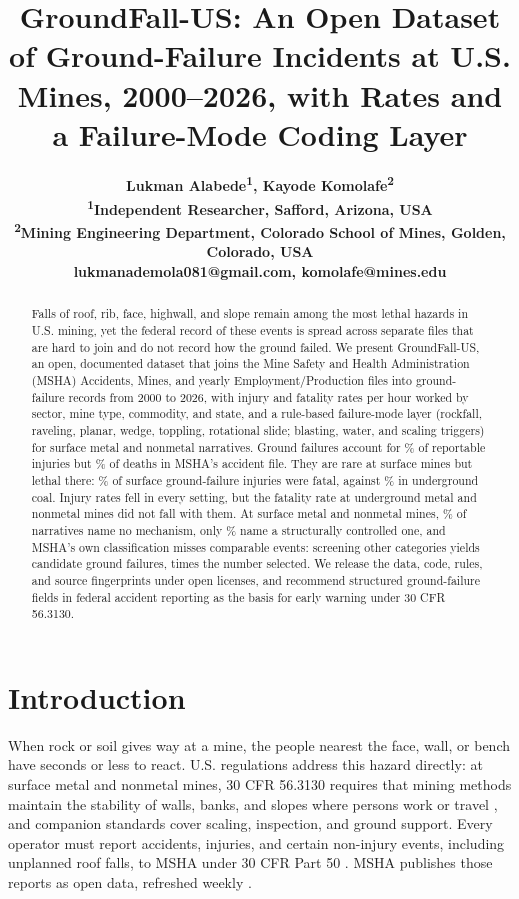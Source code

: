 \documentclass[letterpaper,twocolumn,10pt]{article}
\title{\Large\bfseries GroundFall-US: An Open Dataset of Ground-Failure Incidents at U.S. Mines, 2000--2026, with Rates and a Failure-Mode Coding Layer}
\author{\normalsize\bfseries Lukman Alabede\textsuperscript{\rm 1}, Kayode Komolafe\textsuperscript{\rm 2}\\[4pt]
\normalsize\textsuperscript{1}Independent Researcher, Safford, Arizona, USA\\
\normalsize\textsuperscript{2}Mining Engineering Department, Colorado School of Mines, Golden, Colorado, USA\\
\normalsize lukmanademola081@gmail.com, komolafe@mines.edu}
\date{}
\begin{document}
\maketitle

\begin{abstract}
\noindent Falls of roof, rib, face, highwall, and slope remain among the most lethal hazards in U.S. mining, yet the federal record of these events is spread across separate files that are hard to join and do not record how the ground failed. We present GroundFall-US, an open, documented dataset that joins the Mine Safety and Health Administration (MSHA) Accidents, Mines, and yearly Employment/Production files into \NGF{} ground-failure records from 2000 to 2026, with injury and fatality rates per hour worked by sector, mine type, commodity, and state, and a rule-based failure-mode layer (rockfall, raveling, planar, wedge, toppling, rotational slide; blasting, water, and scaling triggers) for surface metal and nonmetal narratives. Ground failures account for \PctGFofInjury\% of reportable injuries but \PctGFofFatal\% of deaths in MSHA's accident file. They are rare at surface mines but lethal there: \CFRSurf\% of surface ground-failure injuries were fatal, against \CFRCUG\% in underground coal. Injury rates fell in every setting, but the fatality rate at underground metal and nonmetal mines did not fall with them. At surface metal and nonmetal mines, \PctUnspecified\% of narratives name no mechanism, only \PctMechanismNamed\% name a structurally controlled one, and MSHA's own classification misses comparable events: screening other categories yields \NCand{} candidate ground failures, \CandRatio{} times the number selected. We release the data, code, rules, and source fingerprints under open licenses, and recommend structured ground-failure fields in federal accident reporting as the basis for early warning under 30 CFR 56.3130.
\end{abstract}

\section{Introduction}
When rock or soil gives way at a mine, the people nearest the face, wall, or bench have seconds or less to react. U.S. regulations address this hazard directly: at surface metal and nonmetal mines, 30 CFR 56.3130 requires that mining methods maintain the stability of walls, banks, and slopes where persons work or travel \citep{CFR563130}, and companion standards cover scaling, inspection, and ground support. Every operator must report accidents, injuries, and certain non-injury events, including unplanned roof falls, to MSHA under 30 CFR Part 50 \citep{CFRPart50}. MSHA publishes those reports as open data, refreshed weekly \citep{MSHAOGD}.
\end{document}
